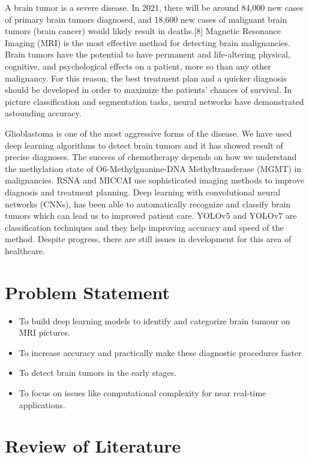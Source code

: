 \documentclass[a4paper,12pt]{extarticle}
\begin{document}
A brain tumor is a severe disease. In 2021, there will be around 84,000 new cases of primary brain tumors diagnosed, and 18,600 new cases of malignant brain tumors (brain cancer) would likely result in deaths.[8] Magnetic Resonance Imaging (MRI) is the most effective method for detecting brain malignancies. Brain tumors\cite{shen2017deep} have the potential to have permanent and life-altering physical, cognitive, and psychological effects on a patient, more so than any other malignancy. For this reason, the best treatment plan and a quicker diagnosis should be developed in order to maximize the patients' chances of survival. In picture classification and segmentation tasks, neural networks have demonstrated astounding accuracy.

Glioblastoma is one of the most aggressive forms of the disease. We have used deep learning algorithms to detect brain tumors and it has showed result of precise diagnoses. The success of chemotherapy depends on how we understand the methylation state of O6-Methylguanine-DNA Methyltransferase (MGMT)\cite{litjens2017survey} in malignancies. RSNA and MICCAI use sophisticated imaging methods to improve diagnosis and treatment planning. Deep learning with convolutional neural networks (CNNs), has been able to automatically recognize and classify brain tumors which can lead us to improved patient care. YOLOv5 and YOLOv7 are classification techniques and they help improving accuracy and speed of the method. Despite progress, there are still issues in development for this area of healthcare.
 


\section{Problem Statement}

\begin{itemize}

    \item To build deep learning models to identify and categorize brain tumour on MRI pictures.
    \item To increase accuracy and practically make these diagnostic procedures faster
    \item To detect brain tumors in the early stages.
    \item To focus on issues like computational complexity for near real-time applications.
\end{itemize}

\section{Review of Literature}
\end{document}
